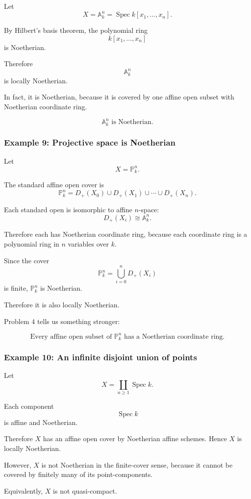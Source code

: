 \documentclass[12pt,a4paper]{article}
\DeclareMathOperator{\Spec}{Spec}
\providecommand{\Spec}{\operatorname{Spec}}
\providecommand{\A}{\mathbb A}
\theoremstyle{notespace}
\begin{document}
Let
\[
X=\A^n_k=\Spec k[x_1,\dots,x_n].
\]

By Hilbert's basis theorem, the polynomial ring
\[
k[x_1,\dots,x_n]
\]
is Noetherian.

Therefore
\[
\A^n_k
\]
is locally Noetherian.

In fact, it is Noetherian, because it is covered by one affine open subset with Noetherian coordinate ring.

\[
\boxed{
	\A^n_k\text{ is Noetherian.}
}
\]

\subsubsection*{Example 9: Projective space is Noetherian}

Let
\[
X=\mathbb P^n_k.
\]

The standard affine open cover is
\[
\mathbb P^n_k
=
D_+(X_0)\cup D_+(X_1)\cup\cdots\cup D_+(X_n).
\]

Each standard open is isomorphic to affine \(n\)-space:
\[
D_+(X_i)\cong \A^n_k.
\]

Therefore each has Noetherian coordinate ring, because each coordinate ring is a polynomial ring in \(n\) variables over \(k\).

Since the cover
\[
\mathbb P^n_k
=
\bigcup_{i=0}^n D_+(X_i)
\]
is finite, \(\mathbb P^n_k\) is Noetherian.

Therefore it is also locally Noetherian.

Problem 4 tells us something stronger:

\[
\boxed{
	\text{Every affine open subset of }\mathbb P^n_k
	\text{ has a Noetherian coordinate ring.}
}
\]

\subsubsection*{Example 10: An infinite disjoint union of points}

Let
\[
X=\coprod_{n\geq 1}\Spec k.
\]

Each component
\[
\Spec k
\]
is affine and Noetherian.

Therefore \(X\) has an affine open cover by Noetherian affine schemes. Hence \(X\) is locally Noetherian.

However, \(X\) is not Noetherian in the finite-cover sense, because it cannot be covered by finitely many of its point-components.

Equivalently, \(X\) is not quasi-compact.
\end{document}
